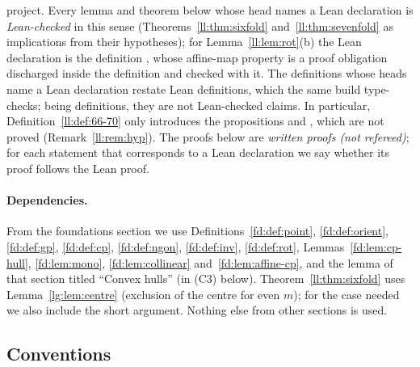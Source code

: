 project. Every lemma and theorem below whose head names a Lean declaration is \emph{Lean-checked} in this sense
(Theorems~\ref{ll:thm:sixfold} and~\ref{ll:thm:sevenfold} as implications from their hypotheses); for
Lemma~\ref{ll:lem:rot}(b) the Lean declaration is the definition , whose affine-map property is a proof
obligation discharged inside the definition and checked with it. The definitions whose heads name a Lean declaration restate Lean
definitions, which the same build type-checks; being definitions, they are not Lean-checked claims. In particular,
Definition~\ref{ll:def:66-70} only introduces the propositions  and , which are not
proved (Remark~\ref{ll:rem:hyp}). The proofs below are \emph{written proofs (not refereed)}; for each statement that
corresponds to a Lean declaration we say whether its proof follows the Lean proof.

\paragraph{Dependencies.} From the foundations section we use Definitions~\ref{fd:def:point}, \ref{fd:def:orient},
\ref{fd:def:gp}, \ref{fd:def:cp}, \ref{fd:def:ngon}, \ref{fd:def:inv}, \ref{fd:def:rot}, Lemmas~\ref{fd:lem:cp-hull},
\ref{fd:lem:mono}, \ref{fd:lem:collinear} and~\ref{fd:lem:affine-cp}, and the lemma of that section titled ``Convex
hulls'' (in (C3) below). Theorem~\ref{ll:thm:sixfold} uses Lemma~\ref{lg:lem:centre} (exclusion of the centre for
even $m$); for the case needed we also include the short argument. Nothing else from other sections is used.

\subsection{Conventions}

